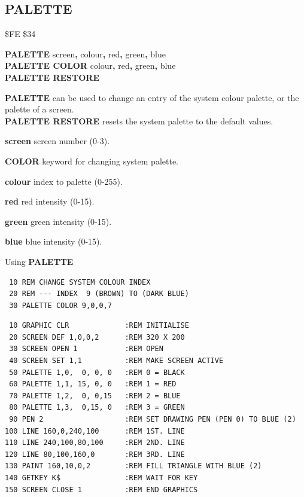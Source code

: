 \subsection{PALETTE}
\begin{description}[leftmargin=2cm,style=nextline]
\item [Token:] \$FE \$34
\item [Format:] {\bf PALETTE} screen{\bf,} colour{\bf,} red{\bf,} green{\bf,} blue \\
		{\bf PALETTE COLOR} colour{\bf,} red{\bf,} green{\bf,} blue \\
                {\bf PALETTE RESTORE}
\item [Usage:]  {\bf PALETTE} can be used to change an
                entry of the system colour palette, or the palette
                of a screen. \\
                {\bf PALETTE RESTORE} resets the system palette to
                the default values.

                {\bf screen} screen number (0-3).

                {\bf COLOR} keyword for changing system palette.

                {\bf colour} index to palette (0-255).

                {\bf red} red intensity (0-15).

                {\bf green} green intensity (0-15).

                {\bf blue} blue intensity (0-15).

\item [Example:] Using {\bf PALETTE}

\begin{tcolorbox}[colback=black,coltext=white]
\verbatimfont{\codefont}
\begin{verbatim}
 10 REM CHANGE SYSTEM COLOUR INDEX
 20 REM --- INDEX  9 (BROWN) TO (DARK BLUE)
 30 PALETTE COLOR 9,0,0,7
\end{verbatim}
\end{tcolorbox}

\begin{tcolorbox}[colback=black,coltext=white]
\verbatimfont{\codefont}
\begin{verbatim}
 10 GRAPHIC CLR             :REM INITIALISE
 20 SCREEN DEF 1,0,0,2      :REM 320 X 200
 30 SCREEN OPEN 1           :REM OPEN
 40 SCREEN SET 1,1          :REM MAKE SCREEN ACTIVE
 50 PALETTE 1,0,  0, 0, 0   :REM 0 = BLACK
 60 PALETTE 1,1, 15, 0, 0   :REM 1 = RED
 70 PALETTE 1,2,  0, 0,15   :REM 2 = BLUE
 80 PALETTE 1,3,  0,15, 0   :REM 3 = GREEN
 90 PEN 2                   :REM SET DRAWING PEN (PEN 0) TO BLUE (2)
100 LINE 160,0,240,100      :REM 1ST. LINE
110 LINE 240,100,80,100     :REM 2ND. LINE
120 LINE 80,100,160,0       :REM 3RD. LINE
130 PAINT 160,10,0,2        :REM FILL TRIANGLE WITH BLUE (2)
140 GETKEY K$               :REM WAIT FOR KEY
150 SCREEN CLOSE 1          :REM END GRAPHICS
\end{verbatim}
\end{tcolorbox}
\end{description}

